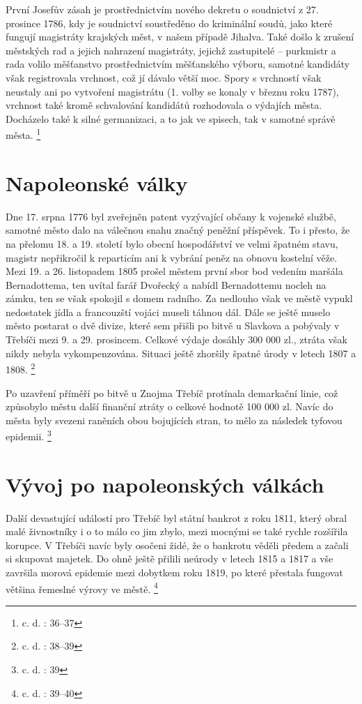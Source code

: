 \documentclass[a4paper,oneside,12p]{report}
\begin{document}
První Josefův zásah je prostřednictvím nového dekretu o soudnictví z 27. prosince 1786, kdy je soudnictví soustředěno do kriminální soudů, jako které fungují magistráty krajských měst, v našem případě Jihalva.
Také došlo k zrušení městských rad a jejich nahrazení magistráty, jejichž zastupitelé -- purkmistr a rada volilo měšťanstvo prostřednictvím měšťanského výboru, samotné kandidáty však registrovala vrchnost, což jí dávalo větší moc.
Spory s vrchností však neustaly ani po vytvoření magistrátu (1. volby se konaly v březnu roku 1787), vrchnost také kromě schvalování kandidátů rozhodovala o výdajích města.
Docházelo také k silné germanizaci, a to jak ve spisech, tak v samotné správě města. \footnote{c. d. : 36--37}

\section{Napoleonské války}

Dne 17. srpna 1776 byl zveřejněn patent vyzývající občany k vojenské službě, samotné město dalo na válečnou snahu značný peněžní příspěvek.
To i přesto, že na přelomu 18. a 19. století bylo obecní hospodářství ve velmi špatném stavu, magistr nepřikročil k reparticím ani k vybrání peněz na obnovu kostelní věže.
Mezi 19. a 26. listopadem 1805 prošel městem první sbor bod vedením maršála Bernadottema, ten uvítal farář Dvořecký a nabídl Bernadottemu nocleh na zámku, ten se však spokojil s domem radního.
Za nedlouho však ve městě vypukl nedostatek jídla a francouzští vojáci museli táhnou dál.
Dále se ještě muselo město postarat o dvě divize, které sem přišli po bitvě u Slavkova a  pobývaly v Třebíči mezi 9. a 29. prosincem.
Celkové výdaje dosáhly 300 000 zl., ztráta však nikdy nebyla vykompenzována.
Situaci ještě zhoršily špatné úrody v letech 1807 a 1808. \footnote{c. d. : 38--39}

Po uzavření příměří po bitvě u Znojma Třebíč protínala demarkační linie, což způsobylo městu další finanční ztráty o celkové hodnotě 100 000 zl.
Navíc do města byly svezeni raněních obou bojujících stran, to mělo za následek tyfovou epidemii. \footnote{c. d. : 39}

\section{Vývoj po napoleonských válkách}

Další devastující událostí pro Třebíč byl státní bankrot z roku 1811, který obral malé živnostníky i o to málo co jim zbylo, mezi mocnými se také rychle rozšířila korupce.
V Třebíči navíc byly osočeni židé, že o bankrotu věděli předem a začali si skupovat majetek.
Do ohně ještě přilili neúrody v letech 1815 a 1817 a vše završila morová epidemie mezi dobytkem roku 1819, po které přestala fungovat většina řemeslné výrovy ve městě. \footnote{c. d. : 39--40}
\end{document}
